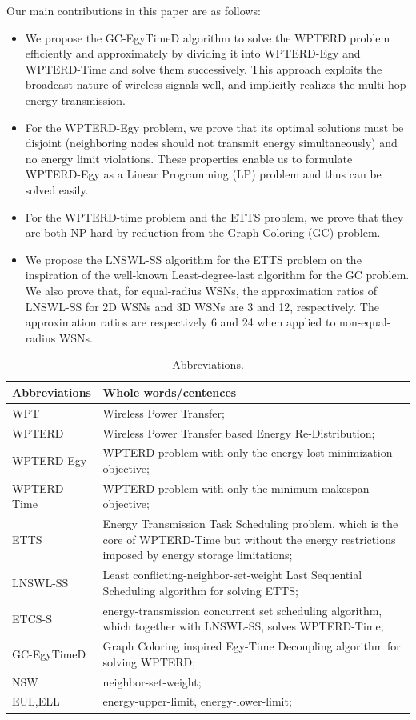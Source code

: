 \documentclass[journal,10pt]{IEEEtran}
\begin{document}
Our main contributions in this paper are as follows:

\begin{itemize}
\item{We propose the GC-EgyTimeD algorithm to solve the WPTERD problem efficiently and approximately by dividing it into WPTERD-Egy and WPTERD-Time and solve them successively. This approach exploits the broadcast nature of wireless signals well, and implicitly realizes the multi-hop energy transmission.}
\item{For the WPTERD-Egy problem, we prove that its optimal solutions must be disjoint (neighboring nodes should not transmit energy simultaneously) and no energy limit violations. These properties enable us to formulate WPTERD-Egy as a Linear Programming (LP) problem and thus can be solved easily.}
\item{For the WPTERD-time problem and the ETTS problem, we prove that they are both NP-hard by reduction from the Graph Coloring (GC) problem.}
\item{We propose the LNSWL-SS algorithm for the ETTS problem on the inspiration of the well-known Least-degree-last algorithm for the GC problem. We also prove that, for equal-radius WSNs, the approximation ratios of LNSWL-SS for 2D WSNs and 3D WSNs are 3 and 12, respectively. The approximation ratios are respectively 6 and 24 when applied to non-equal-radius WSNs.}
\end{itemize}


\begin{table}[!htbp]
\caption{Abbreviations.}
\centering
\label{T0}
\footnotesize{
\begin{tabular}
{|p{}|p{}|}
\hline
\hline
\textbf{Abbreviations} & Whole words/centences\\
\hline
\hline
WPT & Wireless Power Transfer;\\
\hline
WPTERD & Wireless Power Transfer based Energy Re-Distribution;\\
\hline
WPTERD-Egy & WPTERD problem with only the energy lost minimization objective;\\
\hline
WPTERD-Time & WPTERD problem with only the minimum makespan objective;\\
\hline
ETTS & Energy Transmission Task Scheduling problem, which is the core of WPTERD-Time but without the energy restrictions imposed by energy storage limitations;\\
\hline
LNSWL-SS & Least conflicting-neighbor-set-weight Last Sequential Scheduling algorithm for solving ETTS;\\
\hline
ETCS-S & energy-transmission concurrent set scheduling algorithm, which together with LNSWL-SS, solves WPTERD-Time;\\
\hline
GC-EgyTimeD & Graph Coloring inspired Egy-Time Decoupling algorithm  for solving WPTERD;\\
\hline
NSW & neighbor-set-weight;\\
\hline
EUL,ELL & energy-upper-limit, energy-lower-limit;\\
\hline
\hline
\end{tabular}
}
\end{table}
\end{document}
